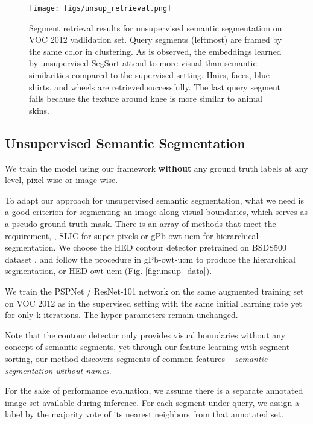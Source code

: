 \documentclass[10pt,twocolumn,letterpaper]{article}
\begin{document}
\begin{figure}
    \centering
    \texttt{[image: figs/unsup\_retrieval.png]}
    \caption{Segment retrieval results for unsupervised semantic segmentation on VOC 2012 vadlidation set. Query segments (leftmost) are framed by the same color in clustering. As is observed, the embeddings learned by unsupervised SegSort attend to more visual than semantic similarities compared to the supervised setting. Hairs, faces, blue shirts, and wheels are retrieved successfully. The last query segment fails because the texture around knee is more similar to animal skins.}
    \label{fig:unsup_retrieval}
    \vspace{-6pt}
\end{figure}




\subsection{Unsupervised Semantic Segmentation}
\label{sec:exp_unsupervised}


We train the model using our framework {\bf without} any ground truth labels at any level, pixel-wise or image-wise. 

To adapt our approach for unsupervised semantic segmentation, what we need is a good criterion for segmenting an image along visual boundaries, which serves as a pseudo ground truth mask. There is an array of methods that meet the requirement, \eg, SLIC \cite{achanta2012slic} for super-pixels or gPb-owt-ucm \cite{arbelaez2011contour} for hierarchical segmentation. We choose the HED contour detector \cite{xie2015holistically} pretrained on BSDS500 dataset \cite{arbelaez2011contour}, and follow the procedure in gPb-owt-ucm \cite{arbelaez2011contour} to produce the hierarchical segmentation, or HED-owt-ucm (Fig. \ref{fig:unsup_data}).


We train the PSPNet / ResNet-101 network on the same augmented training set on VOC 2012 as in the supervised setting with the same initial learning rate yet for only k iterations. The hyper-parameters remain unchanged.

Note that the contour detector only provides visual boundaries without any concept of semantic segments, yet through our feature learning with segment sorting, our method discovers segments of common features -- {\it semantic segmentation without names}.

For the sake of performance evaluation, we assume there is a separate annotated image set available during inference. For each segment under query, we assign a label by  the  majority  vote  of  its  nearest  neighbors  from that annotated set. 
\end{document}
